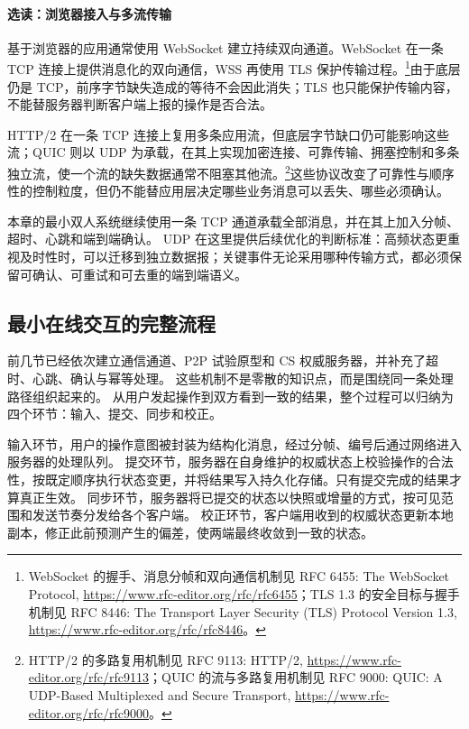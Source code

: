 \paragraph{选读：浏览器接入与多流传输}

基于浏览器的应用通常使用 WebSocket 建立持续双向通道。WebSocket 在一条 TCP 连接上提供消息化的双向通信，WSS 再使用 TLS 保护传输过程。\footnote{WebSocket 的握手、消息分帧和双向通信机制见 RFC 6455: The WebSocket Protocol, \url{https://www.rfc-editor.org/rfc/rfc6455}；TLS 1.3 的安全目标与握手机制见 RFC 8446: The Transport Layer Security (TLS) Protocol Version 1.3, \url{https://www.rfc-editor.org/rfc/rfc8446}。}由于底层仍是 TCP，前序字节缺失造成的等待不会因此消失；TLS 也只能保护传输内容，不能替服务器判断客户端上报的操作是否合法。

HTTP/2 在一条 TCP 连接上复用多条应用流，但底层字节缺口仍可能影响这些流；QUIC 则以 UDP 为承载，在其上实现加密连接、可靠传输、拥塞控制和多条独立流，使一个流的缺失数据通常不阻塞其他流。\footnote{HTTP/2 的多路复用机制见 RFC 9113: HTTP/2, \url{https://www.rfc-editor.org/rfc/rfc9113}；QUIC 的流与多路复用机制见 RFC 9000: QUIC: A UDP-Based Multiplexed and Secure Transport, \url{https://www.rfc-editor.org/rfc/rfc9000}。}这些协议改变了可靠性与顺序性的控制粒度，但仍不能替应用层决定哪些业务消息可以丢失、哪些必须确认。

本章的最小双人系统继续使用一条 TCP 通道承载全部消息，并在其上加入分帧、超时、心跳和端到端确认。
UDP 在这里提供后续优化的判断标准：高频状态更重视及时性时，可以迁移到独立数据报；关键事件无论采用哪种传输方式，都必须保留可确认、可重试和可去重的端到端语义。

\subsection{最小在线交互的完整流程}\label{sec2:battle-flow}

前几节已经依次建立通信通道、P2P 试验原型和 CS 权威服务器，并补充了超时、心跳、确认与幂等处理。
这些机制不是零散的知识点，而是围绕同一条处理路径组织起来的。
从用户发起操作到双方看到一致的结果，整个过程可以归纳为四个环节：输入、提交、同步和校正。

输入环节，用户的操作意图被封装为结构化消息，经过分帧、编号后通过网络进入服务器的处理队列。
提交环节，服务器在自身维护的权威状态上校验操作的合法性，按既定顺序执行状态变更，并将结果写入持久化存储。只有提交完成的结果才算真正生效。
同步环节，服务器将已提交的状态以快照或增量的方式，按可见范围和发送节奏分发给各个客户端。
校正环节，客户端用收到的权威状态更新本地副本，修正此前预测产生的偏差，使两端最终收敛到一致的状态。

